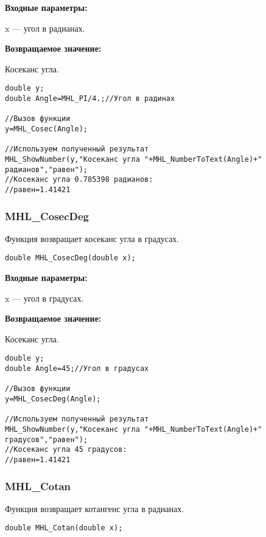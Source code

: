 \documentclass[a4paper,12pt]{article}
\begin{document}
\textbf{Входные параметры:}

 x --- угол в радианах.

\textbf{Возвращаемое значение:}

Косеканс угла.


\begin{lstlisting}[label=code_use_MHL_Cosec,caption=Пример использования]
double y;
double Angle=MHL_PI/4.;//Угол в радинах

//Вызов функции
y=MHL_Cosec(Angle);

//Используем полученный результат
MHL_ShowNumber(y,"Косеканс угла "+MHL_NumberToText(Angle)+" радианов","равен");
//Косеканс угла 0.785398 радианов:
//равен=1.41421
\end{lstlisting}

\subsubsection{MHL\_CosecDeg}\label{MHL_CosecDeg}

Функция возвращает косеканс угла в градусах.


\begin{lstlisting}[label=code_syntax_MHL_CosecDeg,caption=Синтаксис]
double MHL_CosecDeg(double x);
\end{lstlisting}

\textbf{Входные параметры:}

 x --- угол в градусах.

\textbf{Возвращаемое значение:}

Косеканс угла.


\begin{lstlisting}[label=code_use_MHL_CosecDeg,caption=Пример использования]
double y;
double Angle=45;//Угол в градусах

//Вызов функции
y=MHL_CosecDeg(Angle);

//Используем полученный результат
MHL_ShowNumber(y,"Косеканс угла "+MHL_NumberToText(Angle)+" градусов","равен");
//Косеканс угла 45 градусов:
//равен=1.41421
\end{lstlisting}

\subsubsection{MHL\_Cotan}\label{MHL_Cotan}

Функция возвращает котангенс угла в радианах.


\begin{lstlisting}[label=code_syntax_MHL_Cotan,caption=Синтаксис]
double MHL_Cotan(double x);
\end{lstlisting}
\end{document}
